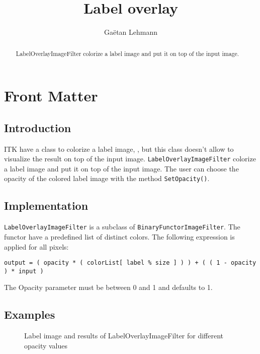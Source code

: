 \documentclass{InsightArticle}
\title{Label overlay}
\author{Ga\"etan Lehmann}
\begin{document}
\maketitle

\ifhtml
\chapter*{Front Matter\label{front}}
\fi


\begin{abstract}
\noindent
LabelOverlayImageFilter colorize a label image and put it on top
of the input image.
\end{abstract}


\section{Introduction}

ITK have a class to colorize a label image, ,
but this class doesn't allow to visualize the result on top of the input
image. \verb$LabelOverlayImageFilter$ colorize a label image and put it on top
of the input image. The user can choose the opacity of the colored label image
with the method \verb$SetOpacity()$.

\section{Implementation}

\verb$LabelOverlayImageFilter$ is a subclass of \verb$BinaryFunctorImageFilter$.
The functor have a predefined list of distinct colors. The following expression
is applied for all pixels:
\small \begin{verbatim}
output = ( opacity * ( colorList[ label % size ] ) ) + ( ( 1 - opacity ) * input )
\end{verbatim} \normalsize
The Opacity parameter must be between 0 and 1 and defaults to 1.

\section{Examples}

\begin{figure}[htbp]
\begin{center}
\caption{Label image and results of LabelOverlayImageFilter for different opacity values}
\end{center}
\end{figure}
\end{document}
